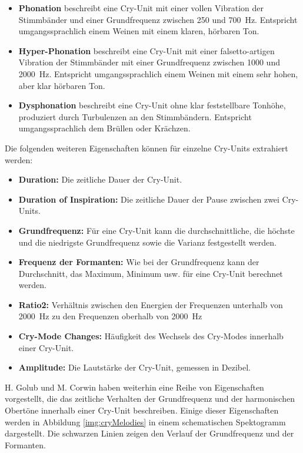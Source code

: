\begin{itemize}
	\item \textbf{Phonation} beschreibt eine Cry-Unit mit einer \glqq vollen Vibration der Stimmbänder\grqq{} und einer Grundfrequenz zwischen 250 und \SI{700}{\hertz}. Entspricht umgangssprachlich einem Weinen mit einem \glqq klaren, hörbaren Ton\grqq{}.
	\item \textbf{Hyper-Phonation} beschreibt eine Cry-Unit mit einer \glqq falsetto-artigen Vibration der Stimmbänder\grqq{} mit einer Grundfrequenz zwischen 1000 und \SI{2000}{\hertz}. Entspricht umgangssprachlich einem Weinen mit einem \glqq sehr hohen, aber klar hörbaren Ton\grqq{}.
	\item \textbf{Dysphonation} beschreibt eine Cry-Unit ohne klar feststellbare Tonhöhe, produziert durch Turbulenzen an den Stimmbändern. Entspricht umgangssprachlich dem \glqq Brüllen oder Krächzen\grqq{}.
\end{itemize}

Die folgenden weiteren Eigenschaften können für einzelne Cry-Units extrahiert werden:

\begin{itemize}
	\item \textbf{Duration:} Die zeitliche Dauer der Cry-Unit.
	\item \textbf{Duration of Inspiration: }Die zeitliche Dauer der Pause zwischen zwei Cry-Units.
	\item \textbf{Grundfrequenz:} Für eine Cry-Unit kann die durchschnittliche, die höchste und die niedrigste Grundfrequenz sowie die Varianz festgestellt werden.
	\item \textbf{Frequenz der Formanten:} Wie bei der Grundfrequenz kann der Durchschnitt, das Maximum, Minimum usw. für eine Cry-Unit berechnet werden.
	\item \textbf{Ratio2: } Verhältnis zwischen den Energien der Frequenzen unterhalb von \SI{2000}{\hertz} zu den Frequenzen oberhalb von \SI{2000}{\hertz}
	\item \textbf{Cry-Mode Changes:} Häufigkeit des Wechsels des Cry-Modes innerhalb einer Cry-Unit.
	\item \textbf{Amplitude:} Die Lautstärke der Cry-Unit, gemessen in Dezibel. \cite[S. 85]{parentalPerception} \cite[S. 156]{threeCryTypes}
\end{itemize}

H. Golub und M. Corwin haben weiterhin eine Reihe von Eigenschaften vorgestellt, die das zeitliche Verhalten der Grundfrequenz und der harmonischen Obertöne innerhalb einer Cry-Unit beschreiben. \cite[S. 73]{cryModel} Einige dieser Eigenschaften werden in Abbildung \ref{img:cryMelodies} in einem schematischen Spektogramm dargestellt. Die schwarzen Linien zeigen  den Verlauf der Grundfrequenz und der Formanten.

